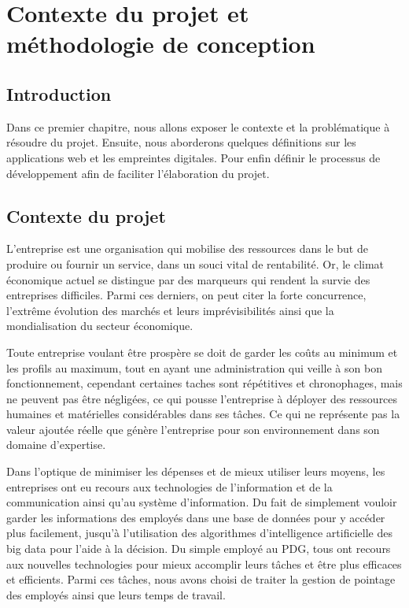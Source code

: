 \chapter{Contexte du projet et méthodologie de
conception}
\renewcommand{\headrulewidth}{1pt}


\section{Introduction}
    Dans ce premier chapitre, nous allons exposer le contexte et la problématique à résoudre du projet. Ensuite, nous aborderons quelques définitions sur les applications web et les empreintes digitales. Pour enfin définir le processus de développement afin de faciliter l’élaboration du projet.


\section{Contexte du projet}

L’entreprise est une organisation qui mobilise des ressources dans le but de produire ou fournir un service, dans un souci vital de rentabilité. Or, le climat économique actuel se distingue par des marqueurs qui rendent la survie des entreprises difficiles. Parmi ces derniers, on peut citer la forte concurrence, l’extrême évolution des marchés et leurs imprévisibilités ainsi que la mondialisation du secteur économique. 

Toute entreprise voulant être prospère se doit de garder les coûts au minimum et les profils au maximum, tout en ayant une administration qui veille à son bon fonctionnement, cependant certaines taches sont répétitives et chronophages, mais ne peuvent pas être négligées, ce qui pousse l’entreprise à déployer des ressources humaines et matérielles considérables dans ses tâches. Ce qui ne représente pas la valeur ajoutée réelle que génère l’entreprise pour son environnement dans son domaine d’expertise. 

Dans l’optique de minimiser les dépenses et de mieux utiliser leurs moyens, les entreprises ont eu recours aux technologies de l’information et de la communication ainsi qu’au système d’information. Du fait de simplement vouloir garder les informations des employés dans une base de données pour y accéder plus facilement, jusqu’à l’utilisation des algorithmes d’intelligence artificielle des big data pour l’aide à la décision. Du simple employé au PDG, tous ont recours aux nouvelles technologies pour mieux accomplir leurs tâches et être plus efficaces et efficients. Parmi ces tâches, nous avons choisi de traiter la gestion de pointage des employés ainsi que leurs temps de travail.  


